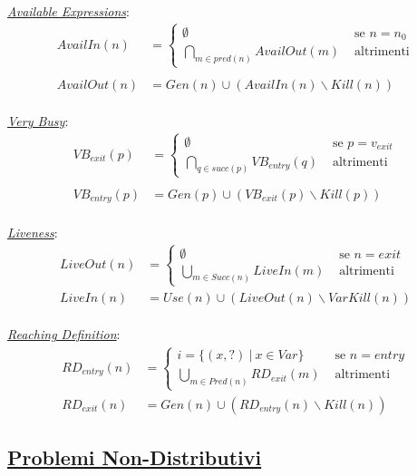 \documentclass[a4paper, 11pt]{report}
\begin{document}
\textit{\underline{Available Expressions}}:
\begin{align*}
AvailIn(n) &= 
\begin{cases}
\emptyset &\text{ se } n = n_0 \\
\bigcap_{m\in pred(n)} AvailOut(m) &\text{ altrimenti}
\end{cases}\\ \\
AvailOut(n) &= Gen(n) \cup (AvailIn(n)\backslash Kill(n))
\end{align*}
\\

\textit{\underline{Very Busy}}:
\begin{align*}
VB_{exit}(p) &= 
\begin{cases}
\emptyset &\text{ se } p = v_{exit} \\
\bigcap_{q\in succ(p)} VB_{entry}(q) &\text{ altrimenti}
\end{cases}\\ \\
VB_{entry}(p) &= Gen(p) \cup (VB_{exit}(p)\backslash Kill(p))
\end{align*}
\\

\textit{\underline{Liveness}}:
\begin{align*}
LiveOut(n) &=
\begin{cases}
\emptyset &\text{ se $n= exit$} \\
\bigcup_{m\in Succ(n)} LiveIn(m) &\text{ altrimenti}
\end{cases}\\
LiveIn(n) &= Use(n) \cup (LiveOut(n)\backslash VarKill(n))
\end{align*}
\\

\textit{\underline{Reaching Definition}}:
\begin{align*}
	RD_{entry}(n) &=
	\begin{cases}
		i=\{(x, ?) ~|~ x\in Var \} &\text{ se $n= entry$} \\
		\bigcup_{m\in Pred(n)} RD_{exit}(m) &\text{ altrimenti}
	\end{cases}\\
	RD_{exit}(n) &= Gen(n) \cup (RD_{entry}(n)\backslash Kill(n))
\end{align*}


\newpage
\subsection*{\underline{Problemi Non-Distributivi}}
\end{document}
